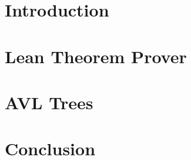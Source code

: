 \documentclass[11pt, oneside, a4paper]{book}
\theoremstyle{definition}
\begin{document}
\tableofcontents

\chapter{Introduction}

\chapter{Lean Theorem Prover}

\chapter{AVL Trees}


\chapter{Conclusion}




\end{document}
